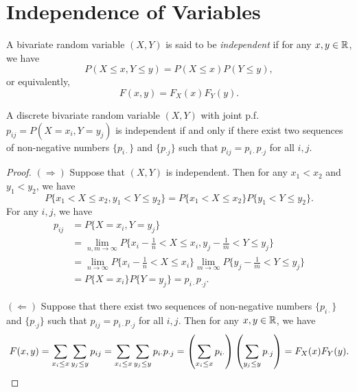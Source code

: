\section{Independence of Variables}

\begin{definition}[Independence]
  A bivariate random variable \((X, Y)\) is said to be \emph{independent} if for any \(x, y \in \mathbb{R}\), we have
  \[
    P(X \leq x, Y \leq y) = P(X \leq x) P(Y \leq y),
  \]
  or equivalently,
  \[
    F(x, y) = F_X(x) F_Y(y).
  \]
\end{definition}

\begin{proposition}
  A discrete bivariate random variable \((X, Y)\) with joint p.f.\@ \(p_{ij} = P(X = x_i, Y = y_j)\) is independent if and only if there exist two sequences of non-negative numbers \(\{p_{i \cdot}\}\) and \(\{p_{\cdot j}\}\) such that \(p_{ij} = p_{i \cdot} p_{\cdot j}\) for all \(i, j\).
\end{proposition}
\begin{proof}
  \((\Rightarrow)\) Suppose that \((X, Y)\) is independent. Then for any \(x_1 < x_2\) and \(y_1 < y_2\), we have
  \[
    P\{x_1 < X \leq x_2, y_1 < Y \leq y_2\} = P\{x_1 < X \leq x_2\} P\{y_1 < Y \leq y_2\}.
  \]
  For any \(i, j\), we have
  \begin{align*}
    p_{ij} &= P\{X = x_i, Y = y_j\} \\
    &= \lim_{n, m \to \infty} P\{x_i - \frac{1}{n} < X \leq x_i, y_j - \frac{1}{m} < Y \leq y_j\} \\
    &= \lim_{n \to \infty} P\{x_i - \frac{1}{n} < X \leq x_i\} \lim_{m \to \infty} P\{y_j - \frac{1}{m} < Y \leq y_j\} \\
    &= P\{X = x_i\} P\{Y = y_j\} = p_{i \cdot} p_{\cdot j}.
  \end{align*}

  \((\Leftarrow)\) Suppose that there exist two sequences of non-negative numbers \(\{p_{i \cdot}\}\) and \(\{p_{\cdot j}\}\) such that \(p_{ij} = p_{i \cdot} p_{\cdot j}\) for all \(i, j\). Then for any \(x, y \in \mathbb{R}\), we have
  \[
    F(x, y) = \sum_{x_i \leq x} \sum_{y_j \leq y} p_{ij} = \sum_{x_i \leq x} \sum_{y_j \leq y} p_{i \cdot} p_{\cdot j} = \left(\sum_{x_i \leq x} p_{i \cdot}\right) \left(\sum_{y_j \leq y} p_{\cdot j}\right) = F_X(x) F_Y(y). \qedhere
  \]
\end{proof}


